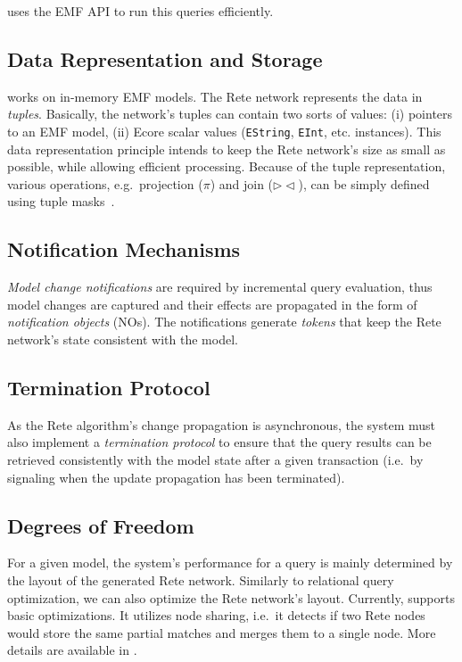 \eiq{} uses the EMF API to run this queries efficiently.

\subsection{Data Representation and Storage}

\eiq{} works on in-memory EMF models. The Rete network represents the data in \emph{tuples}. Basically, the network's tuples can contain two sorts of values: (i) pointers to an EMF model, (ii) Ecore scalar values (\verb+EString+, \verb+EInt+, etc. instances). This data representation principle intends to keep the Rete network's size as small as possible, while allowing efficient processing. Because of the tuple representation, various operations, e.g.\ projection ($ \pi $) and join ($ \rhd\!\!\lhd $), can be simply defined using tuple masks~\cite{BergmannMasters}.

\subsection{Notification Mechanisms}
\label{notifications}

\emph{Model change notifications} are required by incremental query evaluation, thus model changes are captured and their effects are propagated in the form of \emph{notification objects} (NOs). The notifications generate \emph{tokens} that keep the Rete network's state consistent with the model. 

\subsection{Termination Protocol}

As the Rete algorithm's change propagation is asynchronous, the system must also implement a \emph{termination protocol} to ensure that the query results can be retrieved consistently with the model state after a given transaction (i.e.\ by signaling when the update propagation has been terminated).

\subsection{Degrees of Freedom}

For a given model, the system's performance for a query is mainly determined by the layout of the generated Rete network. Similarly to relational query optimization, we can also optimize the Rete network's layout. Currently, \eiq{} supports basic optimizations. It utilizes node sharing, i.e.\ it detects if two Rete nodes would store the same partial matches and merges them to a single node. More details are available in \cite{BergmannPhD}.

